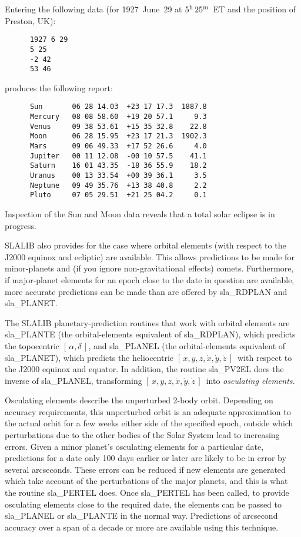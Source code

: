 \documentclass[11pt,twoside]{article}
\newcommand{\radec}     {$[\,\alpha,\delta\,]$}
\newcommand{\xyzxyzd}   {$[\,x,y,z,\dot{x},\dot{y},\dot{z}\,]$}
\begin{document}
Entering the following data (for 1927~June~29 at $5^{\rm h}\,25^{\rm m}$~ET
and the position of Preston, UK):
\begin{verbatim}
      1927 6 29
      5 25
      -2 42
      53 46
\end{verbatim}
produces the following report:
\begin{verbatim}
      Sun       06 28 14.03  +23 17 17.3  1887.8
      Mercury   08 08 58.60  +19 20 57.1     9.3
      Venus     09 38 53.61  +15 35 32.8    22.8
      Moon      06 28 15.95  +23 17 21.3  1902.3
      Mars      09 06 49.33  +17 52 26.6     4.0
      Jupiter   00 11 12.08  -00 10 57.5    41.1
      Saturn    16 01 43.35  -18 36 55.9    18.2
      Uranus    00 13 33.54  +00 39 36.1     3.5
      Neptune   09 49 35.76  +13 38 40.8     2.2
      Pluto     07 05 29.51  +21 25 04.2     0.1
\end{verbatim}
Inspection of the Sun and Moon data reveals that
a total solar eclipse is in progress.

SLALIB also provides for the case where orbital elements (with respect
to the J2000 equinox and ecliptic)
are available.  This allows predictions to be made for minor-planets and
(if you ignore non-gravitational effects)
comets.  Furthermore, if major-planet elements for an epoch close to the date
in question are available, more accurate predictions can be made than
are offered by
sla\_RDPLAN and
sla\_PLANET.

The SLALIB planetary-prediction
routines that work with orbital elements are
sla\_PLANTE (the orbital-elements equivalent of
sla\_RDPLAN), which predicts the topocentric \radec, and
sla\_PLANEL (the orbital-elements equivalent of
sla\_PLANET), which predicts the heliocentric \xyzxyzd\ with respect to the
J2000 equinox and equator.  In addition, the routine
sla\_PV2EL does the inverse of
sla\_PLANEL, transforming \xyzxyzd\ into {\it osculating elements.}

Osculating elements describe the unperturbed 2-body orbit.  Depending
on accuracy requirements, this unperturbed orbit is an
adequate approximation to the actual orbit for a few weeks either
side of the specified epoch, outside which perturbations due to
the other bodies of the Solar System lead to
increasing errors.  Given a minor planet's osculating elements for
a particular date, predictions for a date only
100 days earlier or later
are likely to be in error by several arcseconds.
These errors can
be reduced if new elements are generated which take account of
the perturbations of the major planets, and this is what the routine
sla\_PERTEL does.  Once
sla\_PERTEL has been called, to provide osculating elements
close to the required date, the elements can be passed to
sla\_PLANEL or
sla\_PLANTE in the normal way.  Predictions of arcsecond accuracy
over a span of a decade or more are available using this
technique.
\end{document}
